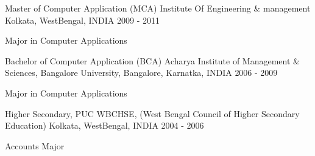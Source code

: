 
%

%
%


\begin{cventries}

  \cventry
    {Master of Computer Application (MCA)} %
    {Institute Of Engineering \& management} %
    {Kolkata, WestBengal, INDIA} %
    {2009 - 2011} %
    {
      \begin{cvitems} %
        \item {Major in Computer Applications}
      \end{cvitems}
    }

  \cventry
    {Bachelor of Computer Application (BCA)} %
    {Acharya Institute of Management \& Sciences, Bangalore University,} %
    {Bangalore, Karnatka, INDIA} %
    {2006 - 2009} %
     {
      \begin{cvitems} %
        \item {Major in Computer Applications}
      \end{cvitems}
    }

  \cventry
    {Higher Secondary, PUC} %
    {WBCHSE, (West Bengal Council of Higher Secondary Education)} %
    {Kolkata, WestBengal, INDIA} %
    {2004 - 2006} %
     {
      \begin{cvitems} %
        \item {Accounts Major}
      \end{cvitems}
    }

\end{cventries}
